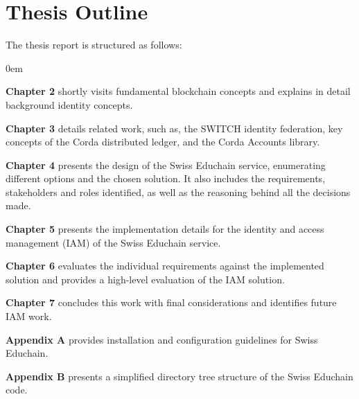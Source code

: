 \section{Thesis Outline}

The thesis report is structured as follows: 
\begin{description}
	\itemsep0em
	\item\textbf{Chapter 2} shortly visits fundamental blockchain concepts and explains in detail background identity concepts.
	\item\textbf{Chapter 3} details related work, such as, the SWITCH identity federation, key concepts of the Corda distributed ledger, and the Corda Accounts library. 
	\item\textbf{Chapter 4} presents the design of the Swiss Educhain service, enumerating different options and the chosen solution. It also includes the requirements, stakeholders and roles identified, as well as the reasoning behind all the decisions made.
	\item\textbf{Chapter 5} presents the implementation details for the identity and access management (IAM) of the Swiss Educhain service.
	\item\textbf{Chapter 6} evaluates the individual requirements against the implemented solution and provides a high-level evaluation of the IAM solution.
	\item\textbf{Chapter 7} concludes this work with final considerations and identifies future IAM work.
	\item\textbf{Appendix A} provides installation and configuration guidelines for Swiss Educhain.
	\item\textbf{Appendix B} presents a simplified directory tree structure of the Swiss Educhain code.
\end{description}
